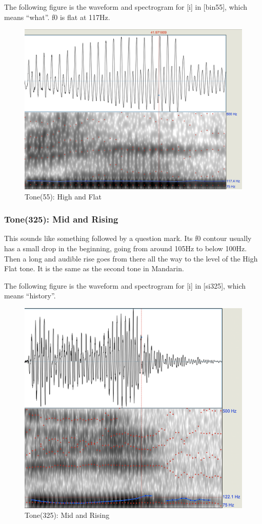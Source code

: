 \documentclass[a4paper]{article}
\begin{document}
The following figure is the waveform and spectrogram for [i] in [bin55], which means ``what''. f0 is flat at 117Hz. 
\begin{figure}[H]
    \centering
    \includegraphics[scale=0.4]{imgs/tone55.png}
    \caption{Tone(55): High and Flat}
\end{figure}

\subsubsection{Tone(325): Mid and Rising}
This sounds like something followed by a question mark. Its f0 contour usually has a small drop in the beginning, going from around 105Hz to below 100Hz. Then a long and audible rise goes from there all the way to the level of the High Flat tone. It is the same as the second tone in Mandarin.

The following figure is the waveform and spectrogram for [i] in [si325], which means ``history''. 
\begin{figure}[H]
    \centering
    \includegraphics[scale=0.4]{imgs/tone325.png}
    \caption{Tone(325): Mid and Rising}
\end{figure}
\end{document}
